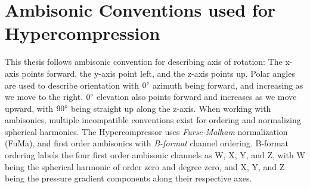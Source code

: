 \section{Ambisonic Conventions used for Hypercompression}
\label{sec:ambis-conv-used}
This thesis follows ambisonic convention for describing axis of
rotation: The x-axis points forward, the y-axis point left, and the
z-axis points up. Polar angles are used to describe orientation with
$0\degree$ azimuth being forward, and increasing as we move to the
right. $0\degree$ elevation also points forward and increases as we
move upward, with $90\degree$ being straight up along the z-axis. When
working with ambisonics, multiple incompatible conventions exist for
ordering and normalizing spherical harmonics.\cite{Nachbar2011} The
Hypercompressor uses \textit{Furse-Malham} normalization
(FuMa)\cite{Malham2003}, and first order ambisonics with
\textit{B-format}\cite{Hollerweger2008} channel ordering. B-format
ordering labels the four first order ambisonic channels as W, X, Y,
and Z, with W being the spherical harmonic of order zero and degree zero,
and X, Y, and Z being the pressure gradient components along their
respective axes. 

